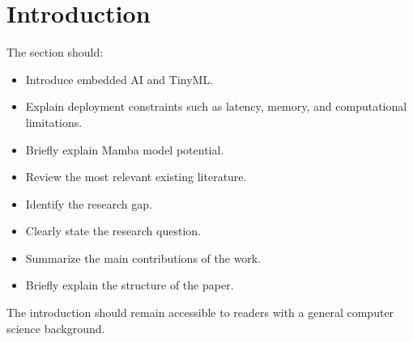 \section{Introduction}

The section should:
\begin{itemize}
  \item Introduce embedded AI and TinyML.
  \item Explain deployment constraints such as latency, memory, and computational limitations.
  \item Briefly explain Mamba model potential.
  \item Review the most relevant existing literature.
  \item Identify the research gap.
  \item Clearly state the research question.
  \item Summarize the main contributions of the work.
  \item Briefly explain the structure of the paper.
\end{itemize}

The introduction should remain accessible to readers with a general computer science background.
